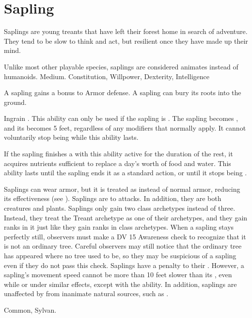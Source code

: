 \section{Sapling}

  Saplings are young treants that have left their forest home in search of adventure.
  They tend to be slow to think and act, but resilient once they have made up their mind.

   Unlike most other playable species, saplings are considered animates instead of humanoids.
   Medium.
    Constitution,  Willpower,  Dexterity,  Intelligence
  \begin{raggeditemize}
     A sapling gains a  bonus to Armor defense.
     A sapling can bury its roots into the ground.
      \begin{activeability}{Ingrain}
        \abilityusagetime {}.
        \rankline
        This ability can only be used if the sapling is .
        The sapling becomes \braced, and its  becomes 5 feet, regardless of any modifiers that normally apply.
        It cannot voluntarily stop being  while this ability lasts.

        If the sapling finishes a  with this ability active for the duration of the rest, it acquires nutrients sufficient to replace a day's worth of food and water.
        This ability lasts until the sapling ends it as a standard action, or until it stops being .
      \end{activeability}
     Saplings can wear armor, but it is treated as  instead of normal armor, reducing its effectiveness (see ).
     Saplings are \vulnerable to \atFire attacks. In addition, they are both creatures and plants.
     Saplings only gain two class archetypes instead of three.
      Instead, they treat the Treant archetype as one of their archetypes, and they gain ranks in it just like they gain ranks in class archetypes.
     When a sapling stays perfectly still, observers must make a DV 15 Awareness check to recognize that it is not an ordinary tree.
      Careful observers may still notice that the ordinary tree has appeared where no tree used to be, so they may be suspicious of a sapling even if they do not pass this check.
     Saplings have a  penalty to their .
      However, a sapling's movement speed cannot be more than 10 feet slower than its , even while \slowed or under similar effects, except with the  ability.
      In addition, saplings are unaffected by  from inanimate natural sources, such as .
  \end{raggeditemize}
   Common, Sylvan.

